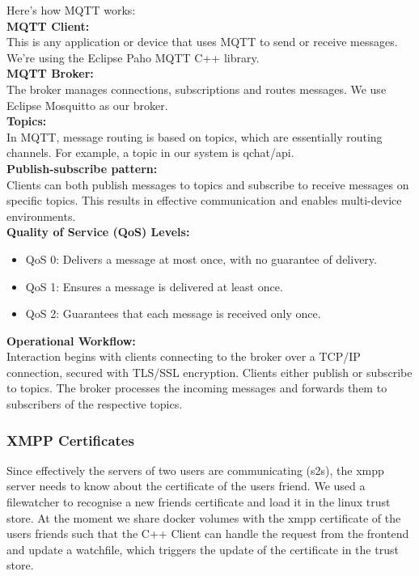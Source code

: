 Here's how MQTT works:\\

\textbf{MQTT Client:}\\
This is any application or device that uses MQTT to send or receive messages. We're using the Eclipse Paho MQTT C++ library.\\

\textbf{MQTT Broker:}\\
The broker manages connections, subscriptions and routes messages. We use Eclipse Mosquitto as our broker.\\

\textbf{Topics:}\\
In MQTT, message routing is based on topics, which are essentially routing channels. For example, a topic in our system is qchat/api.\\

\textbf{Publish-subscribe pattern:}\\
Clients can both publish messages to topics and subscribe to receive messages on specific topics. This results in effective communication and enables multi-device environments. \\

\textbf{Quality of Service (QoS) Levels:}\\
\begin{itemize}
	\item QoS 0: Delivers a message at most once, with no guarantee of delivery.
	\item QoS 1: Ensures a message is delivered at least once.
	\item QoS 2: Guarantees that each message is received only once.
\end{itemize}


\textbf{Operational Workflow:}\\
Interaction begins with clients connecting to the broker over a TCP/IP connection, secured with TLS/SSL encryption. Clients either publish or subscribe to topics. The broker processes the incoming messages and forwards them to subscribers of the respective topics.


\subsubsection{XMPP Certificates}
Since effectively the servers of two users are communicating (s2s), the xmpp server needs to know about the certificate of the users friend. We used a filewatcher to recognise a new friends certificate and load it in the linux trust store. At the moment we share docker volumes with the xmpp certificate of the users friends such that the C++ Client can handle the request from the frontend and update a watchfile, which triggers the update of the certificate in the trust store.


